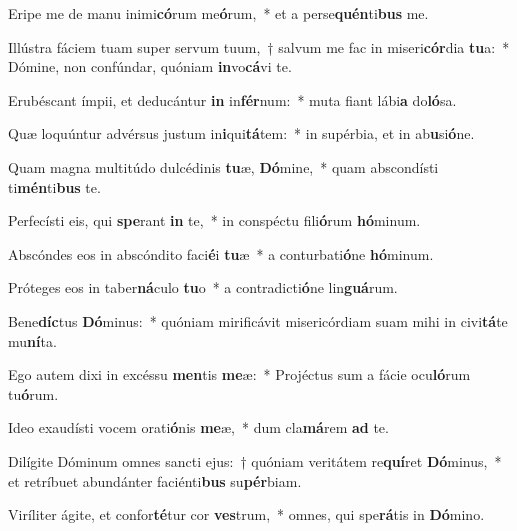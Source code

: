 \item Eripe me de manu inimi\textbf{có}rum me\textbf{ó}rum,~* et a perse\textbf{quén}ti\textbf{bus} me.
\item Illústra fáciem tuam super servum tuum,~† salvum me fac in miseri\textbf{cór}dia \textbf{tu}a:~* Dómine, non confúndar, quóniam \textbf{in}vo\textbf{cá}vi te.
\item Erubéscant ímpii, et deducántur \textbf{in} in\textbf{fér}num:~* muta fiant lábi\textbf{a} do\textbf{ló}sa.
\item Quæ loquúntur advérsus justum in\textbf{i}qui\textbf{tá}tem:~* in supérbia, et in ab\textbf{u}si\textbf{ó}ne.
\item Quam magna multitúdo dulcédinis \textbf{tu}æ, \textbf{Dó}mine,~* quam abscondísti ti\textbf{mén}ti\textbf{bus} te.
\item Perfecísti eis, qui \textbf{spe}rant \textbf{in} te,~* in conspéctu fili\textbf{ó}rum \textbf{hó}minum.
\item Abscóndes eos in abscóndito faci\textbf{é}i \textbf{tu}æ~* a conturbati\textbf{ó}ne \textbf{hó}minum.
\item Próteges eos in taber\textbf{ná}culo \textbf{tu}o~* a contradicti\textbf{ó}ne lin\textbf{guá}rum.
\item Bene\textbf{díc}tus \textbf{Dó}minus:~* quóniam mirificávit misericórdiam suam mihi in civi\textbf{tá}te mu\textbf{ní}ta.
\item Ego autem dixi in excéssu \textbf{men}tis \textbf{me}æ:~* Projéctus sum a fácie ocu\textbf{ló}rum tu\textbf{ó}rum.
\item Ideo exaudísti vocem orati\textbf{ó}nis \textbf{me}æ,~* dum cla\textbf{má}rem \textbf{ad} te.
\item Dilígite Dóminum omnes sancti ejus:~† quóniam veritátem re\textbf{quí}ret \textbf{Dó}minus,~* et retríbuet abundánter faciénti\textbf{bus} su\textbf{pér}biam.
\item Viríliter ágite, et confor\textbf{té}tur cor \textbf{ves}trum,~* omnes, qui spe\textbf{rá}tis in \textbf{Dó}mino.
